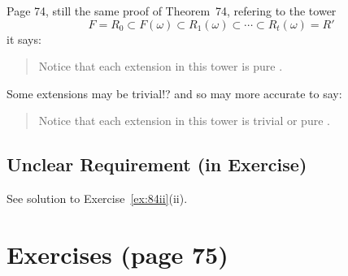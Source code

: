 Page 74, still the same proof of Theorem~74,
refering to the tower
\begin{equation*}
F = R_0 \subset F(\omega) \subset R_1(\omega)
    \subset \cdots \subset R_t(\omega) = R'
\end{equation*}
it says:
\begin{quotation}
Notice that each extension in this tower is pure \mldots.
\end{quotation}
Some extensions may be trivial!? and so may more accurate to say:
\begin{quotation}
Notice that each extension in this tower is trivial or pure \mldots.
\end{quotation}

\subsection{Unclear Requirement (in Exercise)}

See solution to Exercise~\ref{ex:84ii}(ii).

\section{Exercises (page 75)}


